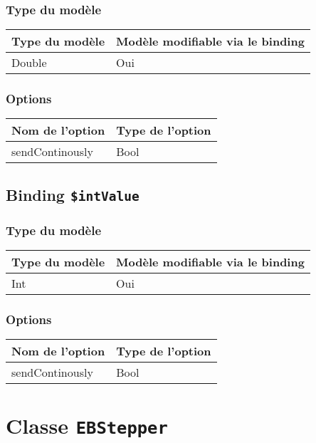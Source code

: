 \subsubsection{Type du modèle}

\begin{tabular}{|l|l|}
\hline
\textbf{Type du modèle} & \textbf{Modèle modifiable via le binding}\\
\hline
Double & Oui\\
\hline
\end{tabular}
\subsubsection{Options}

\begin{tabular}{|l|l|}
\hline
\textbf{Nom de l'option} & \textbf{Type de l'option}\\
\hline
sendContinously & Bool\\
\hline
\end{tabular}
\subsection{Binding \texttt{\$intValue}}

\subsubsection{Type du modèle}

\begin{tabular}{|l|l|}
\hline
\textbf{Type du modèle} & \textbf{Modèle modifiable via le binding}\\
\hline
Int & Oui\\
\hline
\end{tabular}
\subsubsection{Options}

\begin{tabular}{|l|l|}
\hline
\textbf{Nom de l'option} & \textbf{Type de l'option}\\
\hline
sendContinously & Bool\\
\hline
\end{tabular}







\section{Classe \texttt{EBStepper}}

